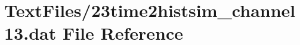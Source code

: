 \hypertarget{23time2histsim__channel13_8dat}{}\section{Text\+Files/23time2histsim\+\_\+channel13.dat File Reference}
\label{23time2histsim__channel13_8dat}
